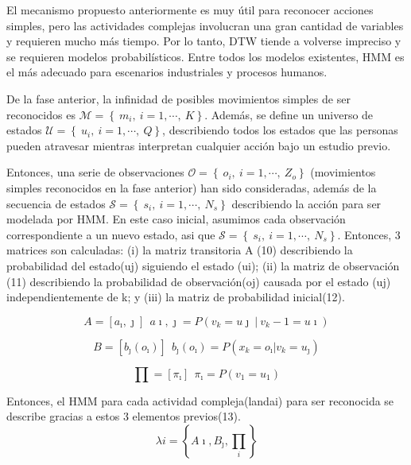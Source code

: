 \documentclass{article}
\begin{document}
El mecanismo propuesto anteriormente es muy útil para reconocer acciones simples, pero las actividades complejas involucran una gran cantidad de variables y requieren mucho más tiempo.
Por lo tanto, DTW tiende a volverse impreciso y se requieren modelos probabilísticos. Entre todos los modelos existentes, HMM es el más adecuado para escenarios industriales y procesos humanos.

De la fase anterior, la infinidad de posibles movimientos simples de ser reconocidos es $\mathcal{M} =  \left\lbrace \ m_i,\ i=1,\cdots , \ K \right\rbrace$. Además, se define un universo de estados  $\mathcal{U} =  \left\lbrace \ u_i,\ i=1,\cdots , \ Q \right\rbrace$, describiendo todos los estados que las personas pueden atravesar mientras interpretan cualquier acción bajo un estudio previo.



Entonces, una serie de observaciones $\mathcal{O} =  \left\lbrace \ o_i,\ i=1,\cdots , \ Z_o \right\rbrace$ (movimientos simples reconocidos en la fase anterior) han sido consideradas, además de la secuencia de estados  $\mathcal{S} =  \left\lbrace \ s_i,\ i=1,\cdots , \ N_s \right\rbrace$ describiendo la acción para ser modelada por HMM. En este caso inicial, asumimos cada observación correspondiente a un nuevo estado, asi que  $\mathcal{S} =  \left\lbrace \ s_i,\ i=1,\cdots , \ N_s \right\rbrace$. Entonces, 3 matrices son calculadas: (i) la matriz transitoria A (10) describiendo la probabilidad del estado(uj) siguiendo el estado (ui); (ii) la matriz de observación (11) describiendo la probabilidad de observación(oj) causada por el estado (uj) independientemente de k; y (iii) la matriz de probabilidad inicial(12).

\begin{equation}A  =\left[a_\imath ,\jmath \right] \ \ a\imath ,\jmath = P\left(v_k = u\jmath \ | \ v_k-1 = u\imath  \right)\end{equation}

\begin{equation}B  =\left[b_\jmath \left(o_\imath \right)  \right] \ \ b_\jmath \left(o_\imath \right)  = P\left(x_k = o_\imath | v_k = u_\jmath  \right)  \end{equation}

\begin{equation}\prod =\left[\pi_\imath \right] \ \ \pi_\imath = P\left(v_1= u_1\right)  \end{equation}

Entonces, el HMM para cada actividad compleja(landai) para ser reconocida se describe gracias a estos 3 elementos previos(13).
\begin{equation}\lambda i=\left\{A\imath ,B_\jmath ,\prod_i  \right\}\end{equation}
\end{document}
